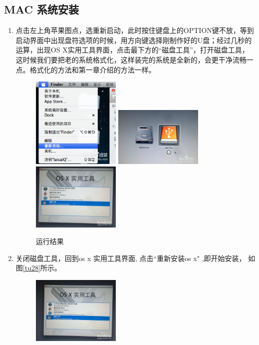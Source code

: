 \documentclass{article}
\begin{document}
\subsection{MAC 系统安装}
\begin{enumerate}
\item 点击左上角苹果图点，选重新启动，此时按住键盘上的OPTION键不放，等到启动界面中出现盘符选项的时候，用方向键选择刚制作好的U盘；经过几秒的运算，出现OS X实用工具界面，点击最下方的“磁盘工具”，打开磁盘工具，这时候我们要把老的系统格式化，这样装完的系统是全新的，会更干净流畅一点。格式化的方法和第一章介绍的方法一样。
\begin{figure}[!htb] %
\centering
\includegraphics[width=0.4\textwidth]{figures/tu21.png}
\includegraphics[width=0.4\textwidth]{figures/tu22.png}
\includegraphics[width=0.4\textwidth]{figures/tu23.png}
\caption{\small 运行结果}
\label{tu21}
\end{figure} 
\item 关闭磁盘工具，回到os x 实用工具界面, 点击“重新安装os x" ,即开始安装，
如图\ref{tu28}所示。
\begin{figure}[!htb] %
\centering
\includegraphics[width=0.4\textwidth]{figures/tu28.png}

\end{figure}
\end{enumerate}
\end{document}
